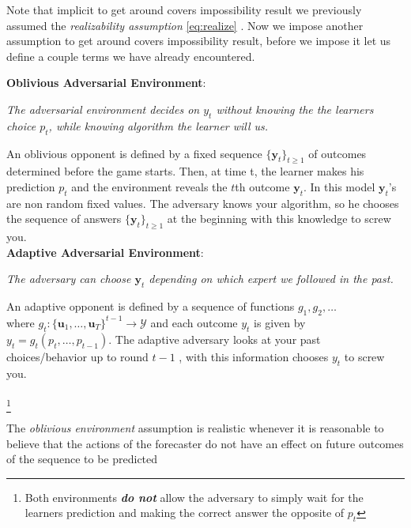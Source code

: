 \documentclass[11pt]{article}
\theoremstyle{quest}
\begin{document}
Note that implicit to get around covers impossibility result we previously assumed the \textit{realizability assumption} {\color{blue} \eqref{eq:realize}} . Now we impose another assumption to get around covers impossibility result, before we impose it let us define a couple terms we have already encountered. 
\begin{tcolorbox}

\textbf{Oblivious Adversarial Environment}:
\begin{center}\textit{The adversarial environment decides on $y_t$ without knowing the the learners choice $p_t$, while knowing algorithm the learner will us.}\end{center}   An oblivious opponent is defined by a fixed sequence $\{\mathbf{y}_t\}_{t\ge1}$ of outcomes determined before the game starts. Then, at time t, the learner makes his prediction $p_t$ and the environment reveals the $t$th outcome $\mathbf{y}_t$. In this model $\mathbf{y}_t$'s are non random fixed values. The adversary knows your algorithm, so he chooses the sequence of answers $\{\mathbf{y}_t\}_{t\ge1}$ at the beginning with this knowledge to screw you.\\ 

\textbf{Adaptive Adversarial Environment}: \label{adaptive} \begin{center}\textit{The adversary can choose $\mathbf{y}_t$ depending on which expert we followed in the past.} \end{center} An adaptive opponent is defined by a sequence of functions $g_1,g_2, \dots$ \\where $g_t: \{\mathbf{u}_1, \dots, \mathbf{u}_T\}^{t-1}\rightarrow \mathcal{Y}$ and each outcome $y_t$ is given by $y_t = g_t(p_t,\dots, p_{t-1})$. The adaptive adversary looks at your past choices/behavior up to round $t-1$ , with this information chooses $y_t$ to screw you.\\ \\ 
\footnote{Both environments \textit{\textbf{do not} }allow the adversary to simply wait for the learners prediction and making the correct answer the opposite of $p_t$ }
\end{tcolorbox}
The \textit{oblivious environment} assumption is realistic whenever it is reasonable to believe that the actions of the forecaster do not have an effect on future outcomes of the sequence to be predicted
\end{document}

